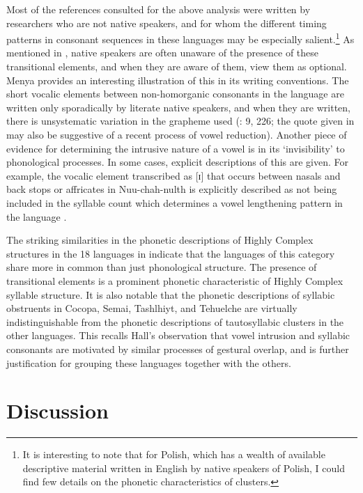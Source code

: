   Most of the references consulted for the above analysis were written by researchers who are not native speakers, and for whom the different timing patterns in consonant sequences in these languages may be especially salient.\footnote{{It is interesting to note that for Polish, which has a wealth of available descriptive material written in English by native speakers of Polish, I could find few details on the phonetic characteristics of clusters.}} As mentioned in , native speakers are often unaware of the presence of these transitional elements, and when they are aware of them, view them as optional. Menya provides an interesting illustration of this in its writing conventions. The short vocalic elements between non-homorganic consonants in the language are written only sporadically by literate native speakers, and when they are written, there is unsystematic variation in the grapheme used (\citealt{Whitehead2004}: 9, 226; the quote given in  may also be suggestive of a recent process of vowel reduction). Another piece of evidence for determining the intrusive nature of a vowel is in its ‘invisibility’ to phonological processes. In some cases, explicit descriptions of this are given. For example, the vocalic element transcribed as [ɪ] that occurs between nasals and back stops or affricates in Nuu-chah-nulth is explicitly described as not being included in the syllable count which determines a vowel lengthening pattern in the language \citep[27]{Rose1981}.

  The striking similarities in the phonetic descriptions of Highly Complex structures in the 18 languages in  indicate that the languages of this category share more in common than just phonological structure. The presence of transitional elements is a prominent phonetic characteristic of Highly Complex syllable structure. It is also notable that the phonetic descriptions of syllabic obstruents in Cocopa, Semai, Tashlhiyt, and Tehuelche are virtually indistinguishable from the phonetic descriptions of tautosyllabic clusters in the other languages. This recalls Hall’s observation that vowel intrusion and syllabic consonants are motivated by similar processes of gestural overlap, and is further justification for grouping these languages together with the others.

\section{Discussion}\label{sec:3.5}

